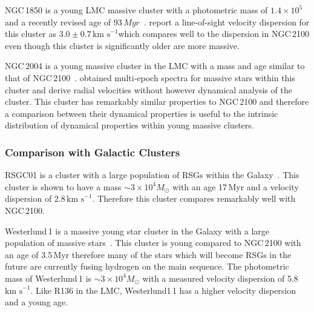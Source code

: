 \documentclass[useAMS,usenatbib]{mn2e}
\def\kms{$\mbox{km s}^{-1}$}
\begin{document}
NGC\,1850 is a young LMC massive cluster with a photometric mass of $1.4\times10^{5}$ and a recently revised age of $93\,Myr$~\citep{2015A&A...575A..62N}.
\citet{2005ApJS..161..304M} report a line-of-sight velocity dispersion for this cluster as $3.0\pm0.7\,$\kms which compares well to the dispersion in NGC\,2100 even though this cluster is significantly older are more massive.

NGC\,2004 is a young massive cluster in the LMC with a mass and age similar to that of NGC\,2100~\citep[20\,Myr; $2\times10^{4}M_{\odot}$][and references therein]{2015A&A...575A..62N}.
\citet{2006A&A...456..623E} obtained multi-epoch spectra for massive stars within this cluster and derive radial velocities without however dynamical analysis of the cluster.
This cluster has remarkably similar properties to NGC\,2100 and therefore a comparison between their dynamical properties is useful to the intrinsic distribution of dynamical properties within young massive clusters.


\subsubsection{Comparison with Galactic Clusters} %
\label{sub:galactic_clusters}

RSGC01 is a cluster with a large population of RSGs within the Galaxy~\citep{2007ApJ...671..781D}.
This cluster is shown to have a mass $\sim3\times10^{4}M_{\odot}$ with an age 17\,Myr and a velocity dispersion of 2.8\,\kms.
Therefore this cluster compares remarkably well with NGC\,2100.

Westerlund\,1 is a massive young star cluster in the Galaxy with a large population of massive stars~\citep{2005A&A...434..949C}.
This cluster is young compared to NGC\,2100 with an age of 3.5\,Myr therefore many of the stars which will become RSGs in the future are currently fusing hydrogen on the main sequence.
The photometric mass of Westerlund\,1 is $\sim3\times10^{4}M_{\odot}$ with a measured velocity dispersion of 5.8\,\kms.
Like R136 in the LMC, Westerlund1\,1 has a higher velocity dispersion and a young age.



\end{document}

